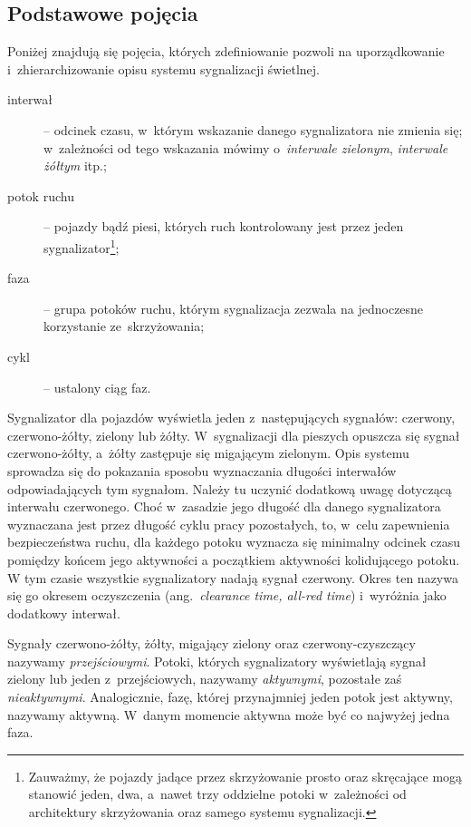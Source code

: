 \documentclass{pracamgr}
\newcommand{\ang}[1]{(ang.~\emph{#1})}
\theoremstyle{plain}
\begin{document}
\subsection{Podstawowe pojęcia}
\label{ss:pojecia}

Poniżej znajdują się pojęcia, których zdefiniowanie pozwoli na
uporządkowanie i~zhierarchizowanie opisu systemu sygnalizacji
świetlnej.
\begin{description}
  \item[interwał] -- odcinek czasu, w~którym wskazanie danego
  sygnalizatora nie zmienia się; w~zależności od tego wskazania mówimy
  o~\emph{interwale zielonym}, \emph{interwale żółtym} itp.;
  \item[potok ruchu] -- pojazdy bądź piesi, których ruch kontrolowany
  jest przez jeden sygnalizator\footnote{Zauważmy, że pojazdy jadące
    przez skrzyżowanie prosto oraz skręcające mogą stanowić jeden,
    dwa, a~nawet trzy oddzielne potoki w~zależności od architektury
    skrzyżowania oraz samego systemu sygnalizacji.};
  \item[faza] -- grupa potoków ruchu, którym sygnalizacja zezwala na
  jednoczesne korzystanie ze~skrzyżowania;
  \item[cykl] -- ustalony ciąg faz.
\end{description}

Sygnalizator dla pojazdów wyświetla jeden z~następujących sygnałów:
czerwony, czerwono-żółty, zielony lub żółty. W~sygnalizacji dla
pieszych opuszcza się sygnał czerwono-żółty, a~żółty zastępuje się
migającym zielonym. Opis systemu sprowadza się do pokazania sposobu
wyznaczania długości interwałów odpowiadających tym sygnałom. Należy
tu uczynić dodatkową uwagę dotyczącą interwału czerwonego. Choć w~zasadzie jego
długość dla danego sygnalizatora wyznaczana jest przez długość cyklu
pracy pozostałych, to, w~celu zapewnienia bezpieczeństwa ruchu, dla
każdego potoku wyznacza się minimalny odcinek czasu pomiędzy końcem
jego aktywności a początkiem aktywności kolidującego potoku. W tym
czasie wszystkie sygnalizatory nadają sygnał czerwony. Okres ten
nazywa się go okresem oczyszczenia \ang{clearance time, all-red time}
i~wyróżnia jako dodatkowy interwał.

Sygnały czerwono-żółty, żółty, migający zielony oraz
czerwony-czyszczący nazywamy \emph{przejściowymi}. Potoki, których
sygnalizatory wyświetlają sygnał zielony lub jeden z~przejściowych,
nazywamy \emph{aktywnymi}, pozostałe zaś
\emph{nieaktywnymi}. Analogicznie, fazę, której przynajmniej jeden
potok jest aktywny, nazywamy aktywną. W~danym momencie aktywna może być
co najwyżej jedna faza.
\end{document}
